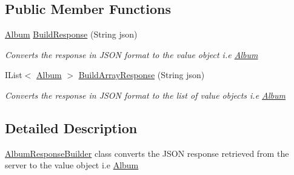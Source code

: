 \subsection*{Public Member Functions}
\begin{DoxyCompactItemize}
\item 
\hyperlink{classcom_1_1shephertz_1_1app42_1_1paas_1_1sdk_1_1csharp_1_1gallery_1_1_album}{Album} \hyperlink{classcom_1_1shephertz_1_1app42_1_1paas_1_1sdk_1_1csharp_1_1gallery_1_1_album_response_builder_adeb5d3110caf277b62fe3b30e86552da}{Build\+Response} (String json)
\begin{DoxyCompactList}\small\item\em Converts the response in J\+S\+O\+N format to the value object i.\+e \hyperlink{classcom_1_1shephertz_1_1app42_1_1paas_1_1sdk_1_1csharp_1_1gallery_1_1_album}{Album} \end{DoxyCompactList}\item 
I\+List$<$ \hyperlink{classcom_1_1shephertz_1_1app42_1_1paas_1_1sdk_1_1csharp_1_1gallery_1_1_album}{Album} $>$ \hyperlink{classcom_1_1shephertz_1_1app42_1_1paas_1_1sdk_1_1csharp_1_1gallery_1_1_album_response_builder_af792fe3ef794960ddd33d1f2e7a4f92d}{Build\+Array\+Response} (String json)
\begin{DoxyCompactList}\small\item\em Converts the response in J\+S\+O\+N format to the list of value objects i.\+e \hyperlink{classcom_1_1shephertz_1_1app42_1_1paas_1_1sdk_1_1csharp_1_1gallery_1_1_album}{Album} \end{DoxyCompactList}\end{DoxyCompactItemize}


\subsection{Detailed Description}
\hyperlink{classcom_1_1shephertz_1_1app42_1_1paas_1_1sdk_1_1csharp_1_1gallery_1_1_album_response_builder}{Album\+Response\+Builder} class converts the J\+S\+O\+N response retrieved from the server to the value object i.\+e \hyperlink{classcom_1_1shephertz_1_1app42_1_1paas_1_1sdk_1_1csharp_1_1gallery_1_1_album}{Album} 



